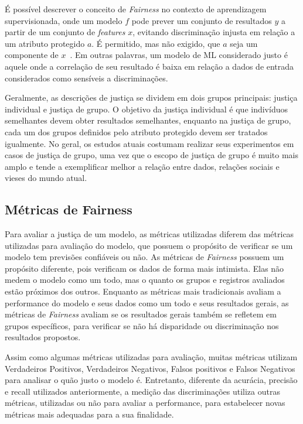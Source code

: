 \documentclass[portugues]{ic-tese}
\begin{document}
É possível descrever o conceito de \textit{Fairness} no contexto de aprendizagem supervisionada, onde um modelo $f$ pode prever um conjunto de resultados $y$ a partir de um conjunto de \textit{features} $x$, evitando discriminação injusta em relação a um atributo protegido $a$. É permitido, mas não exigido, que $a$ seja um componente de $x$~\citep{Begley_2021}. Em outras palavras, um modelo de ML considerado justo é aquele onde a correlação de seu resultado é baixa em relação a dados de entrada considerados como sensíveis a discriminações.

Geralmente, as descrições de justiça se dividem em dois grupos principais: justiça individual e justiça de grupo. O objetivo da justiça individual é que indivíduos semelhantes devem obter resultados semelhantes, enquanto na justiça de grupo, cada um dos grupos definidos pelo atributo protegido devem ser tratados igualmente. No geral, os estudos atuais costumam realizar seus experimentos em casos de justiça de grupo, uma vez que o escopo de justiça de grupo é muito mais amplo e tende a exemplificar melhor a relação entre dados, relações sociais e vieses do mundo atual.

\subsection{Métricas de Fairness}

Para avaliar a justiça de um modelo, as métricas utilizadas diferem das métricas utilizadas para avaliação do modelo, que possuem o propósito de verificar se um modelo tem previsões confiáveis ou não. As métricas de \textit{Fairness} possuem um propósito diferente, pois verificam os dados de forma mais intimista. Elas não medem o modelo como um todo, mas o quanto os grupos e registros avaliados estão próximos dos outros. Enquanto as métricas mais tradicionais avaliam a performance do modelo e seus dados como um todo e seus resultados gerais, as métricas de \textit{Fairness} avaliam se os resultados gerais também se refletem em grupos específicos, para verificar se não há disparidade ou discriminação nos resultados propostos.

Assim como algumas métricas utilizadas para avaliação, muitas métricas utilizam Verdadeiros Positivos, Verdadeiros Negativos, Falsos positivos e Falsos Negativos para analisar o quão justo o modelo é. Entretanto, diferente da acurácia, precisão e recall utilizados anteriormente, a medição das discriminações utiliza outras métricas, utilizadas ou não para avaliar a performance, para estabelecer novas métricas mais adequadas para a sua finalidade.
\end{document}
